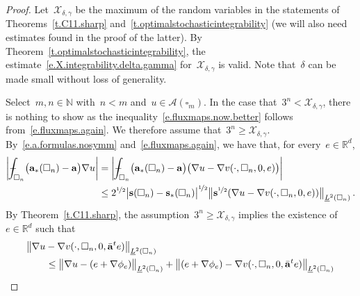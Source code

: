 \documentclass[11pt,twoside]{article} %
\let\oldsquare\square %
\renewcommand{\square}{\oldsquare}
\numberwithin{equation}{section}
\theoremstyle{definition}
\newcommand*{\N}{\ensuremath{\mathbb{N}}}
\newcommand*{\Rd}{\ensuremath{\mathbb{R}^d}}
\newcommand{\s}{\mathbf{s}}
\renewcommand{\a}{\mathbf{a}}
\newcommand{\ahom}{\bar{\a}}
\newcommand{\cu}{\square}
\newcommand{\X}{\mathcal{X}}
\def\Xint#1{\mathchoice
{\XXint\displaystyle\textstyle{#1}}%
{\XXint\textstyle\scriptstyle{#1}}%
{\XXint\scriptstyle\scriptscriptstyle{#1}}%
{\XXint\scriptscriptstyle\scriptscriptstyle{#1}}%
\!\int}
\def\XXint#1#2#3{{\setbox0=\hbox{$#1{#2#3}{\int}$}
\vcenter{\hbox{$#2#3$}}\kern-.5\wd0}}
\def\fint{\Xint-}
\newcommand{\A}{\mathcal{A}}
\begin{document}
\begin{proof}
Let~$\X_{\delta,\gamma}$ be the maximum of the random variables in the statements of Theorems~\ref{t.C11.sharp} and~\ref{t.optimalstochasticintegrability} (we will also need estimates found in the proof of the latter). By Theorem~\ref{t.optimalstochasticintegrability}, the estimate~\eqref{e.X.integrability.delta.gamma} for~$\X_{\delta,\gamma}$ is valid. Note that~$\delta$ can be made small without loss of generality. 

\smallskip

Select~$m,n\in\N$ with~$n<m$ and~$u\in \A(\cu_m)$. 
In the case that~$3^n < \X_{\delta,\gamma}$, there is nothing to show as the inequality~\eqref{e.fluxmaps.now.better} follows from~\eqref{e.fluxmaps.again}. 
We therefore assume that~$3^n \geq \X_{\delta,\gamma}$. 
By~\eqref{e.a.formulas.nosymm} and~\eqref{e.fluxmaps.again}, we have that, for every~$e\in\Rd$, 
\begin{align}
\label{e.removep}
\biggl| \fint_{\cu_n} \bigl( \a_*(\cu_n) - \a \bigr) \nabla u \biggr| 
&
=
\biggl| \fint_{\cu_n} \bigl( \a_*(\cu_n) - \a \bigr) \bigl( \nabla u - \nabla v(\cdot,\cu_n,0,e) \bigr) 
\biggr| 
\notag \\ & 
\leq
2^{\nicefrac12} \bigl| \s(\cu_n) - \s_*(\cu_n) \bigr|^{\nicefrac12}  \bigl\| \s^{\nicefrac12} (\nabla u - \nabla  v(\cdot,\cu_n,0,e)) \bigr\|_{\underline{L}^2(\cu_n)} 
\,.
\end{align}
By Theorem~\ref{t.C11.sharp}, the assumption~$3^n \geq \X_{\delta,\gamma}$ implies the existence of~$e\in\Rd$ such that 
\begin{align*}
\lefteqn{ 
\bigl\| \nabla u - \nabla  v(\cdot,\cu_n,0,\ahom^t e)  \bigr\|_{\underline{L}^2(\cu_n)} 
} \qquad & 
\notag \\ &
\leq 
\bigl\| \nabla u - ( e + \nabla \phi_e)  \bigr\|_{\underline{L}^2(\cu_n)} 
+
\bigl\| (e+\nabla \phi_e) - \nabla  v(\cdot,\cu_n,0,\ahom^t e)  \bigr\|_{\underline{L}^2(\cu_n)}  

\end{align*}
\end{proof}
\end{document}
